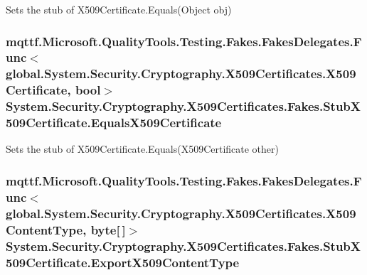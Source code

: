 Sets the stub of X509\-Certificate.\-Equals(\-Object obj)

\hypertarget{class_system_1_1_security_1_1_cryptography_1_1_x509_certificates_1_1_fakes_1_1_stub_x509_certificate_a2d8dd2836744dc542542b919c4960bf5}{
\subsubsection[{Equals\-X509\-Certificate}]{\setlength{\rightskip}{0pt plus 5cm}mqttf.\-Microsoft.\-Quality\-Tools.\-Testing.\-Fakes.\-Fakes\-Delegates.\-Func$<$global.\-System.\-Security.\-Cryptography.\-X509\-Certificates.\-X509\-Certificate, bool$>$ System.\-Security.\-Cryptography.\-X509\-Certificates.\-Fakes.\-Stub\-X509\-Certificate.\-Equals\-X509\-Certificate}}\label{class_system_1_1_security_1_1_cryptography_1_1_x509_certificates_1_1_fakes_1_1_stub_x509_certificate_a2d8dd2836744dc542542b919c4960bf5}


Sets the stub of X509\-Certificate.\-Equals(\-X509\-Certificate other)

\hypertarget{class_system_1_1_security_1_1_cryptography_1_1_x509_certificates_1_1_fakes_1_1_stub_x509_certificate_a97bf16f0cdadec42a9ed372c3584c17e}{
\subsubsection[{Export\-X509\-Content\-Type}]{\setlength{\rightskip}{0pt plus 5cm}mqttf.\-Microsoft.\-Quality\-Tools.\-Testing.\-Fakes.\-Fakes\-Delegates.\-Func$<$global.\-System.\-Security.\-Cryptography.\-X509\-Certificates.\-X509\-Content\-Type, byte\mbox{[}$\,$\mbox{]}$>$ System.\-Security.\-Cryptography.\-X509\-Certificates.\-Fakes.\-Stub\-X509\-Certificate.\-Export\-X509\-Content\-Type}}\label{class_system_1_1_security_1_1_cryptography_1_1_x509_certificates_1_1_fakes_1_1_stub_x509_certificate_a97bf16f0cdadec42a9ed372c3584c17e}


